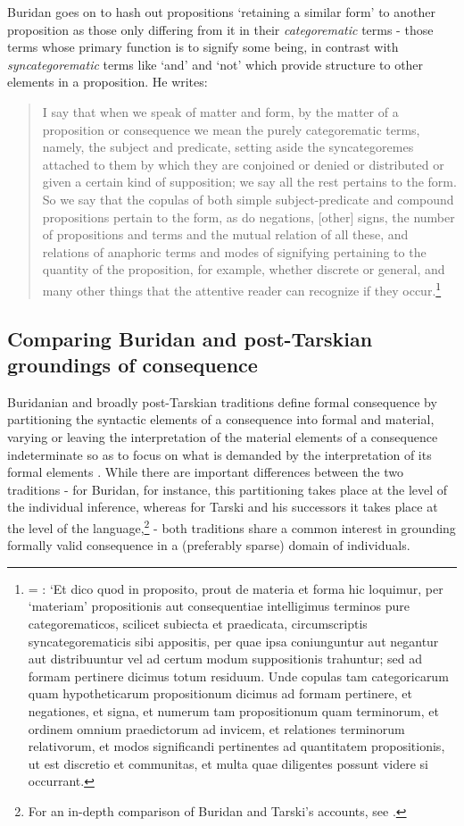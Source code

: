 \documentclass[a4paper, 11pt]{article}
\begin{document}
Buridan goes on to hash out propositions `retaining a similar form' to another proposition as those only differing from it in their \emph{categorematic} terms - those terms whose primary function is to signify some being, in contrast with \emph{syncategorematic} terms like `and' and `not' which provide structure to other elements in a proposition. He writes: 
\begin{quote}
	I say that when we speak of matter and form, by the matter of a proposition or consequence we mean the purely categorematic terms, namely, the subject and predicate, setting aside the syncategoremes attached to them by which they are conjoined or denied or distributed or given a certain kind of supposition; we say all the rest pertains to the form. So we say that the copulas of both simple subject-predicate and compound propositions pertain to the form, as do negations, [other] signs, the number of propositions and terms and the mutual relation of all these, and relations of anaphoric terms and modes of signifying pertaining to the quantity of the proposition, for example, whether discrete or general, and many other things that the attentive reader can recognize if they occur.\footnote{\autocite[74]{Buridan2015} = \autocite[30.7-18]{BuridanTC}: `Et dico quod in proposito, prout de materia et forma hic loquimur, per `materiam' propositionis aut consequentiae intelligimus terminos pure categorematicos, scilicet subiecta et praedicata, circumscriptis syncategorematicis sibi appositis, per quae ipsa coniunguntur aut negantur aut distribuuntur vel ad certum modum suppositionis trahuntur; sed ad formam pertinere dicimus totum residuum. Unde copulas tam categoricarum quam hypotheticarum propositionum dicimus ad formam pertinere, et negationes, et signa, et numerum tam propositionum quam terminorum, et ordinem omnium praedictorum ad invicem, et relationes terminorum relativorum, et modos significandi pertinentes  ad quantitatem propositionis, ut est discretio et communitas, et multa quae diligentes possunt videre si occurrant.}
\end{quote}  

\subsection{Comparing Buridan and post-Tarskian groundings of consequence}
Buridanian and broadly post-Tarskian traditions define formal consequence by partitioning the syntactic elements of a consequence into formal and material, varying or leaving the interpretation of the material elements of a consequence indeterminate so as to focus on what is demanded by the interpretation of its formal elements \autocite[314-321]{DutilhNovaes2011}. While there are important differences between the two traditions - for Buridan, for instance, this partitioning takes place at the level of the individual inference, whereas for Tarski and his successors it takes place at the level of the language,\footnote{For an in-depth comparison of Buridan and Tarski's accounts, see \autocite[ch. 2]{Archambault2017d}.}  - both traditions share a common interest in grounding formally valid consequence in a (preferably sparse) domain of individuals. 
\end{document}
